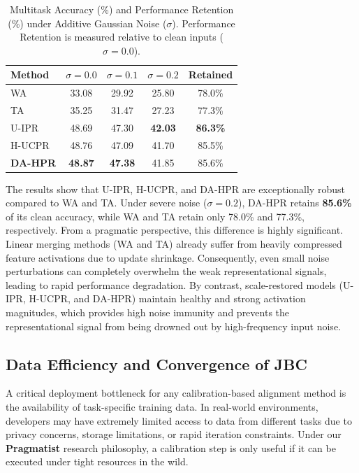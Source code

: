 \documentclass{article}
\theoremstyle{plain}
\theoremstyle{definition}
\theoremstyle{remark}
\begin{document}
\begin{table}[t]
\caption{Multitask Accuracy (\%) and Performance Retention (\%) under Additive Gaussian Noise ($\sigma$). Performance Retention is measured relative to clean inputs ($\sigma=0.0$).}
\label{submission3:tab:robustness}
\vskip 0.15in
\begin{center}
\begin{small}
\begin{sc}
\begin{tabular}{lcccc}
\toprule
Method & $\sigma=0.0$ & $\sigma=0.1$ & $\sigma=0.2$ & Retained \\
\midrule
WA & 33.08 & 29.92 & 25.80 & 78.0\% \\
TA & 35.25 & 31.47 & 27.23 & 77.3\% \\
U-IPR & 48.69 & 47.30 & \textbf{42.03} & \textbf{86.3\%} \\
H-UCPR & 48.76 & 47.09 & 41.70 & 85.5\% \\
\textbf{DA-HPR} & \textbf{48.87} & \textbf{47.38} & 41.85 & 85.6\% \\
\bottomrule
\end{tabular}
\end{sc}
\end{small}
\end{center}
\vskip -0.1in
\end{table}

The results show that U-IPR, H-UCPR, and DA-HPR are exceptionally robust compared to WA and TA.
Under severe noise ($\sigma=0.2$), DA-HPR retains \textbf{85.6\%} of its clean accuracy, while WA and TA retain only 78.0\% and 77.3\%, respectively.
From a pragmatic perspective, this difference is highly significant. 
Linear merging methods (WA and TA) already suffer from heavily compressed feature activations due to update shrinkage. 
Consequently, even small noise perturbations can completely overwhelm the weak representational signals, leading to rapid performance degradation. 
By contrast, scale-restored models (U-IPR, H-UCPR, and DA-HPR) maintain healthy and strong activation magnitudes, which provides high noise immunity and prevents the representational signal from being drowned out by high-frequency input noise.

\subsection{Data Efficiency and Convergence of JBC}
A critical deployment bottleneck for any calibration-based alignment method is the availability of task-specific training data. In real-world environments, developers may have extremely limited access to data from different tasks due to privacy concerns, storage limitations, or rapid iteration constraints. Under our \textbf{Pragmatist} research philosophy, a calibration step is only useful if it can be executed under tight resources in the wild.
\end{document}
